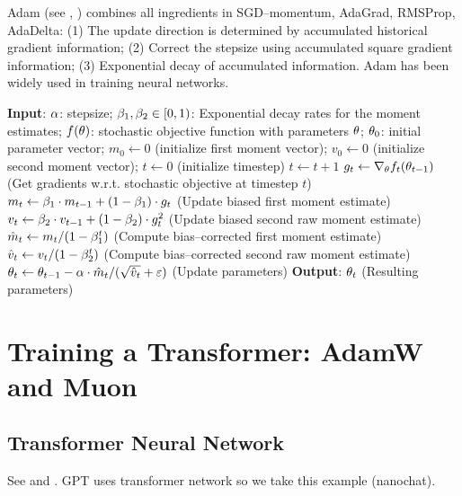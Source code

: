 Adam (see \cite{kingma2015adam}, \cite{reddi2018convergence}) combines all ingredients in SGD--momentum, AdaGrad, RMSProp, AdaDelta: 
(1) The update direction is determined by accumulated historical gradient information;
(2) Correct the stepsize using accumulated square gradient information;
(3) Exponential decay of accumulated information. Adam has been widely used in training neural networks.

\begin{algorithm}[H]
\caption{Adam}
\label{Alg:Adam}
\begin{algorithmic}[1]
\STATE \textbf{Input}: $\alpha$: stepsize; $\beta_1, \beta_2\in [0,1)$: Exponential decay rates for the moment estimates;
                        $f(\theta)$: stochastic objective function with parameters $\theta$;
                        $\theta_0$: initial parameter vector; $m_0 \leftarrow 0$ (initialize first moment vector);
                        $v_0 \leftarrow 0$ (initialize second moment vector);
                        $t \leftarrow 0$ (initialize timestep)
    \STATE $t \leftarrow t+1$
    \STATE $g_t \leftarrow \nabla_\theta f_t(\theta_{t-1})$ (Get gradients w.r.t. stochastic objective at timestep $t$)
    \STATE $m_t \leftarrow \beta_1\cdot m_{t-1}+(1-\beta_1)\cdot g_t$ (Update biased first moment estimate)
    \STATE $v_t \leftarrow \beta_2\cdot v_{t-1}+(1-\beta_2)\cdot g_t^2$ (Update biased second raw moment estimate)
    \STATE $\hat{m}_t \leftarrow m_t/(1-\beta_1^t)$ (Compute bias--corrected first moment estimate)
    \STATE $\hat{v}_t \leftarrow v_t/(1-\beta_2^t)$ (Compute bias--corrected second raw moment estimate)
    \STATE $\theta_t \leftarrow \theta_{t-1}-\alpha\cdot \hat{m}_t/(\sqrt{\hat{v}_t}+\varepsilon)$ (Update parameters)
\ENDWHILE
\STATE \textbf{Output}: $\theta_t$ (Resulting parameters)
\end{algorithmic}
\end{algorithm}

\section{Training a Transformer: AdamW and Muon}
\label{Ch:OptimizationModernML:Transformer}

\subsection{Transformer Neural Network}

See \cite{vaswani2017attention} and \cite{nanochat}.
GPT uses transformer network so we take this example (nanochat). 

